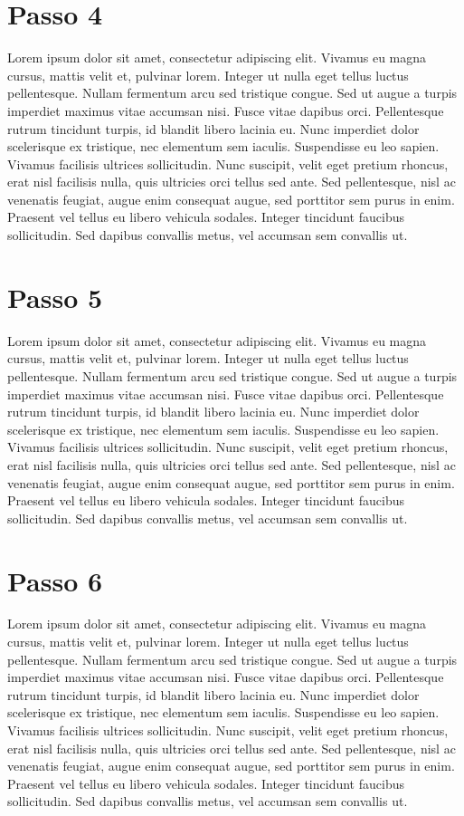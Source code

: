 \section{Passo 4}

Lorem ipsum dolor sit amet, consectetur adipiscing elit. Vivamus eu magna cursus, mattis velit et, pulvinar lorem. Integer ut nulla eget tellus luctus pellentesque. Nullam fermentum arcu sed tristique congue. Sed ut augue a turpis imperdiet maximus vitae accumsan nisi. Fusce vitae dapibus orci. Pellentesque rutrum tincidunt turpis, id blandit libero lacinia eu. Nunc imperdiet dolor scelerisque ex tristique, nec elementum sem iaculis. Suspendisse eu leo sapien. Vivamus facilisis ultrices sollicitudin. Nunc suscipit, velit eget pretium rhoncus, erat nisl facilisis nulla, quis ultricies orci tellus sed ante. Sed pellentesque, nisl ac venenatis feugiat, augue enim consequat augue, sed porttitor sem purus in enim. Praesent vel tellus eu libero vehicula sodales. Integer tincidunt faucibus sollicitudin. Sed dapibus convallis metus, vel accumsan sem convallis ut.

\section{Passo 5}

Lorem ipsum dolor sit amet, consectetur adipiscing elit. Vivamus eu magna cursus, mattis velit et, pulvinar lorem. Integer ut nulla eget tellus luctus pellentesque. Nullam fermentum arcu sed tristique congue. Sed ut augue a turpis imperdiet maximus vitae accumsan nisi. Fusce vitae dapibus orci. Pellentesque rutrum tincidunt turpis, id blandit libero lacinia eu. Nunc imperdiet dolor scelerisque ex tristique, nec elementum sem iaculis. Suspendisse eu leo sapien. Vivamus facilisis ultrices sollicitudin. Nunc suscipit, velit eget pretium rhoncus, erat nisl facilisis nulla, quis ultricies orci tellus sed ante. Sed pellentesque, nisl ac venenatis feugiat, augue enim consequat augue, sed porttitor sem purus in enim. Praesent vel tellus eu libero vehicula sodales. Integer tincidunt faucibus sollicitudin. Sed dapibus convallis metus, vel accumsan sem convallis ut.

\section{Passo 6}

Lorem ipsum dolor sit amet, consectetur adipiscing elit. Vivamus eu magna cursus, mattis velit et, pulvinar lorem. Integer ut nulla eget tellus luctus pellentesque. Nullam fermentum arcu sed tristique congue. Sed ut augue a turpis imperdiet maximus vitae accumsan nisi. Fusce vitae dapibus orci. Pellentesque rutrum tincidunt turpis, id blandit libero lacinia eu. Nunc imperdiet dolor scelerisque ex tristique, nec elementum sem iaculis. Suspendisse eu leo sapien. Vivamus facilisis ultrices sollicitudin. Nunc suscipit, velit eget pretium rhoncus, erat nisl facilisis nulla, quis ultricies orci tellus sed ante. Sed pellentesque, nisl ac venenatis feugiat, augue enim consequat augue, sed porttitor sem purus in enim. Praesent vel tellus eu libero vehicula sodales. Integer tincidunt faucibus sollicitudin. Sed dapibus convallis metus, vel accumsan sem convallis ut.